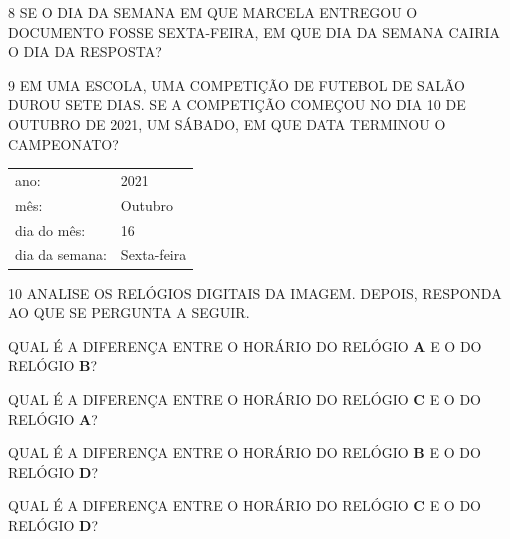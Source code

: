 
\num{8} SE O DIA DA SEMANA EM QUE MARCELA ENTREGOU O DOCUMENTO FOSSE
SEXTA-FEIRA, EM QUE DIA DA SEMANA CAIRIA O DIA DA RESPOSTA?


\num{9} EM UMA ESCOLA, UMA COMPETIÇÃO DE FUTEBOL DE SALÃO DUROU SETE DIAS.
SE A COMPETIÇÃO COMEÇOU NO DIA 10 DE OUTUBRO DE 2021, UM SÁBADO, EM QUE
DATA TERMINOU O CAMPEONATO?

\begin{longtable}[]{@{}ll@{}}
\toprule
ano: & 2021\tabularnewline
mês: & Outubro\tabularnewline
dia do mês: & 16\tabularnewline
dia da semana: & Sexta-feira\tabularnewline
\bottomrule
\end{longtable}


\num{10} ANALISE OS RELÓGIOS DIGITAIS DA IMAGEM. DEPOIS, RESPONDA AO QUE SE PERGUNTA A SEGUIR.


\begin{escolha}
\item QUAL É A DIFERENÇA ENTRE O HORÁRIO DO RELÓGIO \textbf{A} E O DO RELÓGIO \textbf{B}?


\item QUAL É A DIFERENÇA ENTRE O HORÁRIO DO RELÓGIO \textbf{C} E O DO RELÓGIO \textbf{A}?


\item QUAL É A DIFERENÇA ENTRE O HORÁRIO DO RELÓGIO \textbf{B} E O DO RELÓGIO \textbf{D}?


\item QUAL É A DIFERENÇA ENTRE O HORÁRIO DO RELÓGIO \textbf{C} E O DO RELÓGIO \textbf{D}?

\end{escolha}


